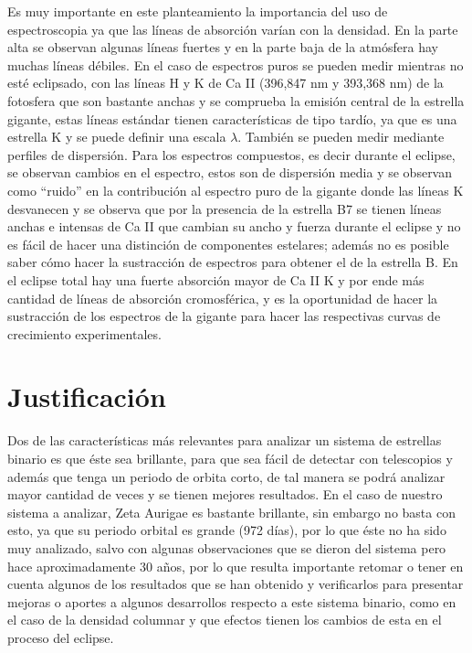\documentclass[11pt]{article}
\begin{document}
\noindent Es muy importante en este planteamiento la importancia del uso de espectroscopia ya que las líneas de absorción varían con la densidad. En la parte alta se observan algunas líneas fuertes y en la parte baja de la atmósfera hay muchas líneas débiles. En el caso de espectros puros se pueden medir mientras no esté eclipsado, con las líneas H y K de Ca II (396,847 nm y 393,368 nm) de la fotosfera que son bastante anchas y se comprueba la emisión central de la estrella gigante, estas líneas estándar tienen características de tipo tardío, ya que es una estrella K y se puede definir una escala $\lambda$. También se pueden medir mediante perfiles de dispersión. Para los espectros compuestos, es decir durante el eclipse, se observan cambios en el espectro, estos son de dispersión media y se observan como ``ruido'' en la contribución al espectro puro de la gigante donde las líneas K desvanecen y se observa que por la presencia de la estrella B7 se tienen líneas anchas e intensas de Ca II que cambian su ancho y fuerza durante el eclipse y no es fácil de hacer una distinción de componentes estelares; además no es posible saber cómo hacer la sustracción de espectros para obtener el de la estrella B. En el eclipse total hay una fuerte absorción mayor de Ca II K y por ende más cantidad de líneas de absorción cromosférica, y es la oportunidad de hacer la sustracción de los espectros de la gigante para hacer las respectivas curvas de crecimiento experimentales. 



\section{Justificación}

\vspace{3mm}
Dos de las características más relevantes para analizar un sistema de estrellas binario es que éste sea brillante, para que sea fácil de detectar con telescopios y además que tenga un periodo de orbita corto, de tal manera se podrá analizar mayor cantidad de veces y se tienen mejores resultados. En el caso de nuestro sistema a analizar, Zeta Aurigae es bastante brillante, sin embargo no basta con esto, ya que su periodo orbital es grande (972 días), por lo que éste no ha sido muy analizado, salvo con algunas observaciones que se dieron del sistema pero hace aproximadamente 30 años, por lo que resulta importante retomar o tener en cuenta algunos de los resultados que se han obtenido y verificarlos para presentar mejoras o aportes a algunos desarrollos respecto a este sistema binario, como en el caso de la densidad columnar y que efectos tienen los cambios de esta en el proceso del eclipse.
\end{document}

